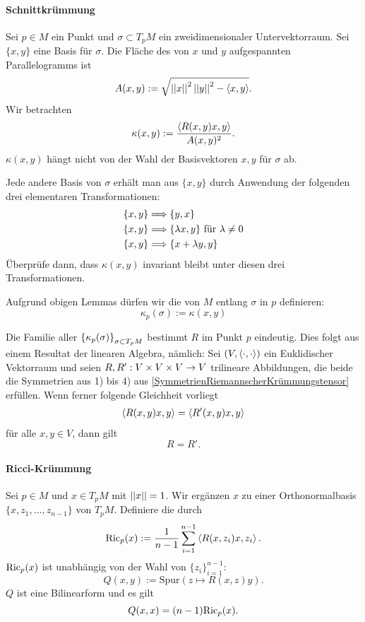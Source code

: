 \paragraph{Schnittkrümmung}
Sei $p \in M$ ein Punkt und $\sigma \subset T_pM$ ein zweidimensionaler Untervektorraum. Sei $\{x,y\}$ eine Basis für $\sigma$. Die Fläche des von $x$ und $y$ aufgespannten Parallelogramms ist
\[ A(x,y) := \sqrt{\left|\left|x\right|\right|^2 \left|\left|y\right|\right|^2 - \left<x,y\right>}. \]
Wir betrachten
\[ \kappa(x,y) := \frac{\left<R(x,y)x,y\right>}{ A(x,y)^2 }. \]
\Lem{}
$\kappa(x,y)$ hängt nicht von der Wahl der Basisvektoren $x,y$ für $\sigma$ ab.
\begin{Beweis}{}
Jede andere Basis von $\sigma$ erhält man aus $\{x,y\}$ durch Anwendung der folgenden drei elementaren Transformationen:
\begin{align*}
\{x,y\} &\overset{}{\Longrightarrow} \{y,x\}\\
\{x,y\} &\overset{}{\Longrightarrow} \{\lambda x, y\} \text{ für }\lambda \neq 0\\
\{x,y\} &\overset{}{\Longrightarrow} \{x + \lambda y, y\}
\end{align*}
Überprüfe dann, dass $\kappa(x,y)$ invariant bleibt unter diesen drei Transformationen.
\end{Beweis}

Aufgrund obigen Lemmas dürfen wir die  von $M$ entlang $\sigma$ in $p$ definieren:
\[ \kappa_p(\sigma) := \kappa(x,y) \]

Die Familie aller $\set{\kappa_p(\sigma)}{}_{\sigma \subset T_pM}$ bestimmt $R$ im Punkt $p$ eindeutig. Dies folgt aus einem Resultat der linearen Algebra, nämlich:
\Prop{}
\label{PropLAREindeutig}
Sei $(V,\left<\cdot, \cdot\right>)$ ein Euklidischer Vektorraum und seien $R,R' : V\times V \times V \overset{}{\rightarrow} V$ trilineare Abbildungen, die beide die Symmetrien aus 1) bis 4) aus \ref{SymmetrienRiemannscherKrümmungstensor} erfüllen. Wenn ferner folgende Gleichheit vorliegt
\begin{align*}
\left<R(x,y)x,y\right> = \left<R'(x,y)x,y\right>
\end{align*}
für alle $x,y \in V$, dann gilt
\[ R = R'.\]

\paragraph{Ricci-Krümmung}
Sei $p \in M$ und $x \in T_pM$ mit $\left|\left|x\right|\right| = 1$. Wir ergänzen $x$ zu einer Orthonormalbasis $\{x, z_1, \ldots, z_{n-1}\}$ von $T_pM$. Definiere die  durch
\[ \mathrm{Ric}_p(x) := \frac{1}{n-1} \sum_{i = 1}^{n-1} \left<R(x,z_i)x,z_i\right>. \]
$\mathrm{Ric}_p(x)$ ist unabhängig von der Wahl von $\{z_i\}_{i = 1}^{n-1}:$
\[ Q(x,y) := \mathrm{Spur}(z \mapsto R(x,z)y) .\]
$Q$ ist eine Bilinearform und es gilt
\[ Q(x,x) = (n-1)\mathrm{Ric}_p(x). \]

